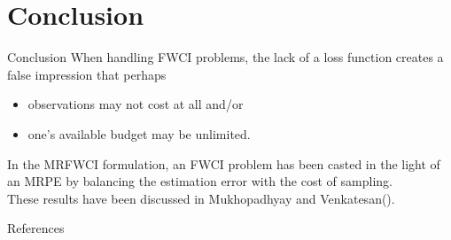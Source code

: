 \documentclass [xcolor=svgnames, t] {beamer}
\begin{document}
    

\section{Conclusion}
\begin{frame}{Conclusion}
\vspace{10mm}
When handling FWCI problems, the lack of a loss function creates a false impression that perhaps 
\begin{itemize}
\item observations may not cost at all and/or 
\item one's available budget may be unlimited. 
\end{itemize}
In the MRFWCI formulation, an FWCI problem has been casted in the light of an MRPE by 
balancing the estimation error with the cost of sampling.\\
\vspace{0.2cm}
These results have been discussed in Mukhopadhyay and Venkatesan(\cite{mrfwci2022}).
\end{frame}

\begin{frame}[allowframebreaks]{References}





\end{frame}
\end{document}
